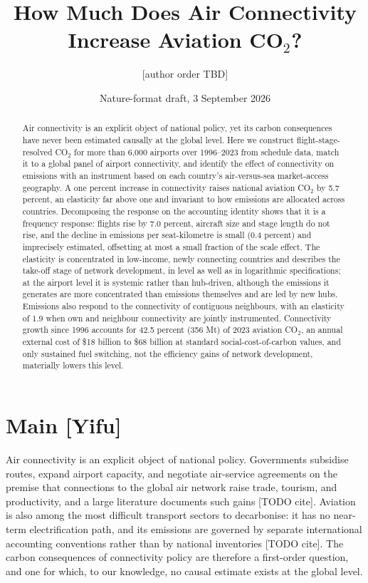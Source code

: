 \documentclass[12pt]{article}
\title{How Much Does Air Connectivity Increase Aviation CO$_2$?}
\author{[author order TBD]}
\date{Nature-format draft, 3 September 2026}
\begin{document}
\maketitle

\begin{abstract}
\noindent Air connectivity is an explicit object of national policy, yet its
carbon consequences have never been estimated causally at the global level.
Here we construct flight-stage-resolved CO$_2$ for more than 6{,}000
airports over 1996--2023 from schedule data, match it to a global panel of
airport connectivity, and identify the effect of connectivity on emissions
with an instrument based on each country's air-versus-sea market-access
geography. A one percent increase in connectivity raises national aviation
CO$_2$ by 5.7 percent, an elasticity far above one and invariant to how
emissions are allocated across countries. Decomposing the response on the
accounting identity shows that it is a frequency response: flights rise by
7.0 percent, aircraft size and stage length do not rise, and the decline in
emissions per seat-kilometre is small (0.4 percent) and imprecisely
estimated, offsetting at most a small fraction of the scale effect. The elasticity is concentrated in low-income, newly connecting
countries and describes the take-off stage of network development, in
level as well as in logarithmic specifications; at the airport level it is systemic rather than hub-driven,
although the emissions it generates are more concentrated than emissions
themselves and are led by new hubs. Emissions also respond to the
connectivity of contiguous neighbours, with an elasticity of 1.9 when own and
neighbour connectivity are jointly instrumented. Connectivity growth since
1996 accounts for 42.5 percent (356 Mt) of 2023 aviation CO$_2$, an annual
external cost of \$18 billion to \$68 billion at standard social-cost-of-carbon
values, and only sustained fuel switching, not the efficiency gains of
network development, materially lowers this level.
\end{abstract}

\section*{Main [Yifu]}
Air connectivity is an explicit object of national policy. Governments
subsidise routes, expand airport capacity, and negotiate air-service
agreements on the premise that connections to the global air network raise
trade, tourism, and productivity, and a large literature documents such
gains [TODO cite]. Aviation is also among the most difficult transport
sectors to decarbonise: it has no near-term electrification path, and its
emissions are governed by separate international accounting conventions
rather than by national inventories [TODO cite]. The carbon consequences of
connectivity policy are therefore a first-order question, and one for
which, to our knowledge, no causal estimate exists at the global level.
\end{document}
